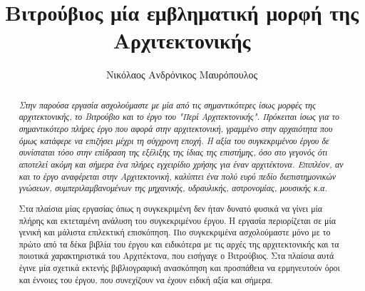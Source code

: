 \documentclass[%
              nobib,
              sfsidenotes,
              notoc,
              justified,
              a4paper,
              twoside,
              nohyper,
              ]%
              {tufte-handout}
\title{Βιτρούβιος μία εμβληματική μορφή της Αρχιτεκτονικής}
\author[Νικόλαος Ανδρόνικος Μαυρόπουλος]{Νικόλαος Ανδρόνικος Μαυρόπουλος}
\begin{document}
              
\maketitle%
  
  
\bigskip            
\begin{abstract}
\itshape
  Στην παρούσα εργασία ασχολούμαστε με μία από τις σημαντικότερες ίσως μορφές της αρχιτεκτονικής, το Βιτρούβιο και το έργο του "Περί Αρχιτεκτονικής". Πρόκειται ίσως για το σημαντικότερο πλήρες έργο που αφορά στην αρχιτεκτονική, γραμμένο στην αρχαιότητα που όμως κατάφερε να επιζήσει μέχρι τη σύγχρονη εποχή. Η αξία του συγκεκριμένου έργου δε συνίσταται τόσο στην επίδραση της εξέλιξης της ίδιας της επιστήμης, όσο στο γεγονός ότι αποτελεί ακόμη και σήμερα ένα πλήρες εγχειρίδιο χρήσης για έναν αρχιτέκτονα. Επιπλέον, αν και το έργο αναφέρεται στην Αρχιτεκτονική, καλύπτει ένα πολύ ευρύ πεδίο διεπιστημονικών γνώσεων, συμπεριλαμβανομένων της μηχανικής, υδραυλικής, αστρονομίας, μουσικής κ.α.
  
  Στα πλαίσια μίας εργασίας όπως η συγκεκριμένη δεν ήταν δυνατό φυσικά να γίνει μία πλήρης και εκτεταμένη ανάλυση του συγκεκριμένου έργου. Η εργασία περιορίζεται σε μία γενική και μάλιστα επιλεκτική επισκόπηση. Πιο συγκεκριμένα ασχολούμαστε μόνο με το πρώτο από τα δέκα βιβλία του έργου και ειδικότερα με τις αρχές της αρχιτεκτονικής και τα ποιοτικά χαρακτηριστικά του Αρχιτέκτονα, που εισήγαγε ο Βιτρούβιος. Στα πλαίσια αυτά έγινε μία σχετικά εκτενής βιβλιογραφική ανασκόπηση και προσπάθεια να ερμηνευτούν όροι και έννοιες του έργου, που συνεχίζουν να έχουν ειδική αξία και σήμερα.

\end{abstract}
\bigskip
              
  
\end{document}
